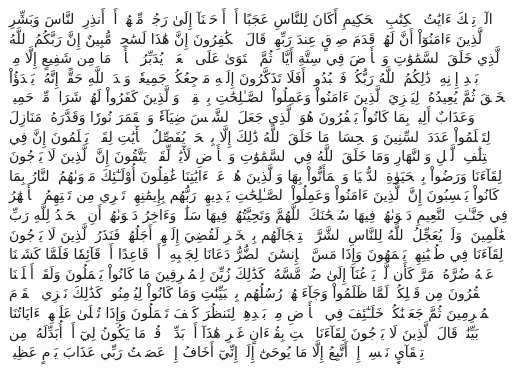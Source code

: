 الٓرۚ تِلۡكَ ءَايَٰتُ ٱلۡكِتَٰبِ ٱلۡحَكِيمِ
أَكَانَ لِلنَّاسِ عَجَبًا أَنۡ أَوۡحَيۡنَآ إِلَىٰ رَجُلٖ مِّنۡهُمۡ أَنۡ أَنذِرِ ٱلنَّاسَ وَبَشِّرِ ٱلَّذِينَ ءَامَنُوٓاْ أَنَّ لَهُمۡ قَدَمَ صِدۡقٍ عِندَ رَبِّهِمۡۗ قَالَ ٱلۡكَٰفِرُونَ إِنَّ هَٰذَا لَسَٰحِرٞ مُّبِينٌ
إِنَّ رَبَّكُمُ ٱللَّهُ ٱلَّذِي خَلَقَ ٱلسَّمَٰوَٰتِ وَٱلۡأَرۡضَ فِي سِتَّةِ أَيَّامٖ ثُمَّ ٱسۡتَوَىٰ عَلَى ٱلۡعَرۡشِۖ يُدَبِّرُ ٱلۡأَمۡرَۖ مَا مِن شَفِيعٍ إِلَّا مِنۢ بَعۡدِ إِذۡنِهِۦۚ ذَٰلِكُمُ ٱللَّهُ رَبُّكُمۡ فَٱعۡبُدُوهُۚ أَفَلَا تَذَكَّرُونَ
إِلَيۡهِ مَرۡجِعُكُمۡ جَمِيعٗاۖ وَعۡدَ ٱللَّهِ حَقًّاۚ إِنَّهُۥ يَبۡدَؤُاْ ٱلۡخَلۡقَ ثُمَّ يُعِيدُهُۥ لِيَجۡزِيَ ٱلَّذِينَ ءَامَنُواْ وَعَمِلُواْ ٱلصَّـٰلِحَٰتِ بِٱلۡقِسۡطِۚ وَٱلَّذِينَ كَفَرُواْ لَهُمۡ شَرَابٞ مِّنۡ حَمِيمٖ وَعَذَابٌ أَلِيمُۢ بِمَا كَانُواْ يَكۡفُرُونَ
هُوَ ٱلَّذِي جَعَلَ ٱلشَّمۡسَ ضِيَآءٗ وَٱلۡقَمَرَ نُورٗا وَقَدَّرَهُۥ مَنَازِلَ لِتَعۡلَمُواْ عَدَدَ ٱلسِّنِينَ وَٱلۡحِسَابَۚ مَا خَلَقَ ٱللَّهُ ذَٰلِكَ إِلَّا بِٱلۡحَقِّۚ يُفَصِّلُ ٱلۡأٓيَٰتِ لِقَوۡمٖ يَعۡلَمُونَ
إِنَّ فِي ٱخۡتِلَٰفِ ٱلَّيۡلِ وَٱلنَّهَارِ وَمَا خَلَقَ ٱللَّهُ فِي ٱلسَّمَٰوَٰتِ وَٱلۡأَرۡضِ لَأٓيَٰتٖ لِّقَوۡمٖ يَتَّقُونَ
إِنَّ ٱلَّذِينَ لَا يَرۡجُونَ لِقَآءَنَا وَرَضُواْ بِٱلۡحَيَوٰةِ ٱلدُّنۡيَا وَٱطۡمَأَنُّواْ بِهَا وَٱلَّذِينَ هُمۡ عَنۡ ءَايَٰتِنَا غَٰفِلُونَ
أُوْلَـٰٓئِكَ مَأۡوَىٰهُمُ ٱلنَّارُ بِمَا كَانُواْ يَكۡسِبُونَ
إِنَّ ٱلَّذِينَ ءَامَنُواْ وَعَمِلُواْ ٱلصَّـٰلِحَٰتِ يَهۡدِيهِمۡ رَبُّهُم بِإِيمَٰنِهِمۡۖ تَجۡرِي مِن تَحۡتِهِمُ ٱلۡأَنۡهَٰرُ فِي جَنَّـٰتِ ٱلنَّعِيمِ
دَعۡوَىٰهُمۡ فِيهَا سُبۡحَٰنَكَ ٱللَّهُمَّ وَتَحِيَّتُهُمۡ فِيهَا سَلَٰمٞۚ وَءَاخِرُ دَعۡوَىٰهُمۡ أَنِ ٱلۡحَمۡدُ لِلَّهِ رَبِّ ٱلۡعَٰلَمِينَ
۞وَلَوۡ يُعَجِّلُ ٱللَّهُ لِلنَّاسِ ٱلشَّرَّ ٱسۡتِعۡجَالَهُم بِٱلۡخَيۡرِ لَقُضِيَ إِلَيۡهِمۡ أَجَلُهُمۡۖ فَنَذَرُ ٱلَّذِينَ لَا يَرۡجُونَ لِقَآءَنَا فِي طُغۡيَٰنِهِمۡ يَعۡمَهُونَ
وَإِذَا مَسَّ ٱلۡإِنسَٰنَ ٱلضُّرُّ دَعَانَا لِجَنۢبِهِۦٓ أَوۡ قَاعِدًا أَوۡ قَآئِمٗا فَلَمَّا كَشَفۡنَا عَنۡهُ ضُرَّهُۥ مَرَّ كَأَن لَّمۡ يَدۡعُنَآ إِلَىٰ ضُرّٖ مَّسَّهُۥۚ كَذَٰلِكَ زُيِّنَ لِلۡمُسۡرِفِينَ مَا كَانُواْ يَعۡمَلُونَ
وَلَقَدۡ أَهۡلَكۡنَا ٱلۡقُرُونَ مِن قَبۡلِكُمۡ لَمَّا ظَلَمُواْ وَجَآءَتۡهُمۡ رُسُلُهُم بِٱلۡبَيِّنَٰتِ وَمَا كَانُواْ لِيُؤۡمِنُواْۚ كَذَٰلِكَ نَجۡزِي ٱلۡقَوۡمَ ٱلۡمُجۡرِمِينَ
ثُمَّ جَعَلۡنَٰكُمۡ خَلَـٰٓئِفَ فِي ٱلۡأَرۡضِ مِنۢ بَعۡدِهِمۡ لِنَنظُرَ كَيۡفَ تَعۡمَلُونَ
وَإِذَا تُتۡلَىٰ عَلَيۡهِمۡ ءَايَاتُنَا بَيِّنَٰتٖ قَالَ ٱلَّذِينَ لَا يَرۡجُونَ لِقَآءَنَا ٱئۡتِ بِقُرۡءَانٍ غَيۡرِ هَٰذَآ أَوۡ بَدِّلۡهُۚ قُلۡ مَا يَكُونُ لِيٓ أَنۡ أُبَدِّلَهُۥ مِن تِلۡقَآيِٕ نَفۡسِيٓۖ إِنۡ أَتَّبِعُ إِلَّا مَا يُوحَىٰٓ إِلَيَّۖ إِنِّيٓ أَخَافُ إِنۡ عَصَيۡتُ رَبِّي عَذَابَ يَوۡمٍ عَظِيمٖ
